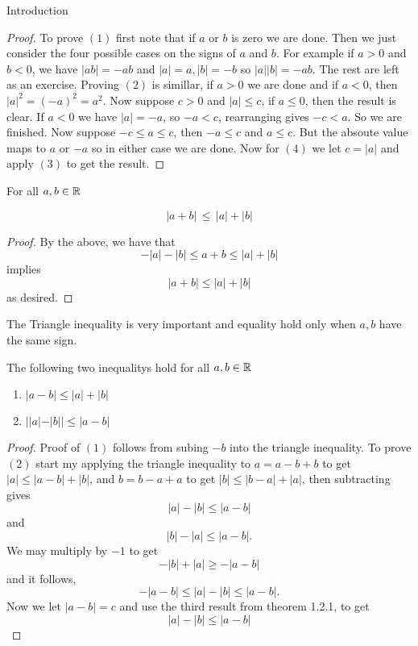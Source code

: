 \begin{chapter}{Introduction}
    
    \begin{proof}
        To prove $(1)$ first note that if $a$ or $b$ is zero we are done. Then we just consider the four possible cases on the signs of $a$ and $b$. For example if $a > 0$ and $b < 0$, 
        we have $|ab| = -ab$ and $|a| = a, |b| = -b$ so $|a||b| = -ab$. The rest are left as an exercise. 
        Proving $(2)$ is simillar, if $a > 0$ we are done and if $a < 0$, then $|a|^2 = (-a)^2 = a^2$. 
        Now suppose $c > 0$ and $|a| \leq c$, if $a \leq 0$, then the result is clear. If $a < 0$ we have $|a| = -a$, so 
        $-a < c$, rearranging gives $-c < a$. So we are finished. Now suppose $-c \leq a \leq c$, then $-a \leq c$ and $a \leq c$. But the absoute value maps to 
        $a$ or $-a$ so in either case we are done. 
        Now for $(4)$ we let $c = |a|$ and apply $(3)$ to get the result. 
    \end{proof}

    
    \begin{thm}
        For all $a, b \in \mathbb{R}$ 
        
        \begin{equation}
            |a + b| \, \leq \, |a| + |b|
        \end{equation}
    \end{thm}

    
    \begin{proof}
        By the above, we have that
        \[-|a| -|b| \leq a + b \leq |a| + |b| \] 
        implies 
        \[|a + b| \leq |a| + |b|\]
        as desired. 
    \end{proof}

    The Triangle inequality is very important and equality hold only when $a, b$ have the same sign. 

    
    
    \begin{thm}
        The following two inequalitys hold for all $a, b \in \mathbb{R}$
        
        \begin{enumerate}
            \item $|a - b| \leq |a| + |b|$
            \item $||a| -|b|| \leq |a - b|$
        \end{enumerate}
    \end{thm}

    
    \begin{proof}
        Proof of $(1)$ follows from subing $-b$ into the triangle inequality. 
        To prove $(2)$ start my applying the triangle inequality to $a = a - b + b$ to get 
        $|a| \leq |a - b| + |b| $, and $b = b - a + a$ to get $|b| \leq |b-a| + |a|$,
        then subtracting gives 
        \[|a| - |b| \leq |a - b| \] 
        and 
        \[|b| - |a| \leq |a - b|.\]
        We may multiply by $-1$ to get 
        \[-|b| + |a| \geq -|a-b|\] 
        and it follows, 
        \[-|a-b| \leq |a| - |b| \leq |a - b|.\]
        Now we let $|a - b| = c$ and use the third result from theorem 1.2.1, to get 
        \[|a|- |b| \leq |a - b|\]

    \end{proof}
\end{chapter}